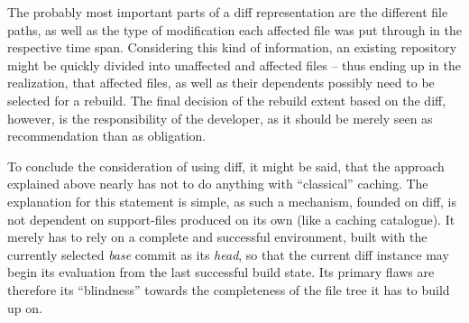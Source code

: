 The probably most important parts of a diff representation are the different file paths, as well as the type of modification each affected file was put through in the respective time span. Considering this kind of information, an existing repository might be quickly divided into unaffected and affected files -- thus ending up in the realization, that affected files, as well as their dependents possibly need to be selected for a rebuild. The final decision of the rebuild extent based on the diff, however, is the responsibility of the developer, as it should be merely seen as recommendation than as obligation.

To conclude the consideration of using diff, it might be said, that the approach explained above nearly has not to do anything with ``classical'' caching. The explanation for this statement is simple, as such a mechanism, founded on diff, is not dependent on support-files produced on its own (like a caching catalogue). It merely has to rely on a complete and  successful environment, built with the currently selected \emph{base} commit as its \emph{head}, so that the current diff instance may begin its evaluation from the last successful build state. Its primary flaws are therefore its ``blindness'' towards the completeness of the file tree it has to build up on.
